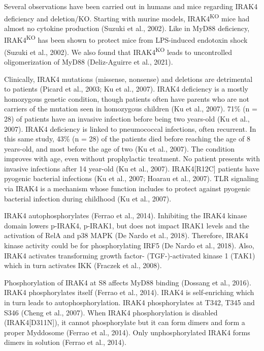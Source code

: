 Several observations have been carried out in humans and mice regarding IRAK4 deficiency and deletion/KO. Starting with murine models, IRAK4\textsuperscript{KO} mice had almost no cytokine production (Suzuki et al., 2002). Like in MyD88 deficiency, IRAK4\textsuperscript{KO} has been shown to protect mice from LPS-induced endotoxin shock (Suzuki et al., 2002). We also found that IRAK4\textsuperscript{KO} leads to uncontrolled oligomerization of MyD88 (Deliz-Aguirre et al., 2021).

Clinically, IRAK4 mutations (missense, nonsense) and deletions are detrimental to patients (Picard et al., 2003; Ku et al., 2007). IRAK4 deficiency is a mostly homozygous genetic condition, though patients often have parents who are not carriers of the mutation seen in homozygous children (Ku et al., 2007). 71\% (n = 28) of patients have an invasive infection before being two years-old (Ku et al., 2007). IRAK4 deficiency is linked to pneumococcal infections, often recurrent. In this same study, 43\% (n = 28) of the patients died before reaching the age of 8 years-old, and most before the age of two (Ku et al., 2007). The condition improves with age, even without prophylactic treatment. No patient presents with invasive infections after 14 year-old (Ku et al., 2007). IRAK4[R12C] patients have pyogenic bacterial infections (Ku et al., 2007; Hoarau et al., 2007). TLR signaling via IRAK4 is a mechanism whose function includes to protect against pyogenic bacterial infection during childhood (Ku et al., 2007).

IRAK4 autophosphorylates (Ferrao et al., 2014). Inhibiting the IRAK4 kinase domain lowers p-IRAK4, p-IRAK1, but does not impact IRAK1 levels and the activation of RelA and p38 MAPK (De Nardo et al., 2018). Therefore, IRAK4 kinase activity could be for phosphorylating IRF5 (De Nardo et al., 2018). Also, IRAK4 activates transforming growth factor-{\textbeta} (TGF-{\textbeta})-activated kinase 1 (TAK1) which in turn activates IKK{\textbeta} (Fraczek et al., 2008).

 Phosphorylation of IRAK4 at S8 affects MyD88 binding (Dossang et al., 2016). IRAK4 phosphorylates itself (Ferrao et al., 2014). IRAK4 is self-enriching which in turn leads to autophosphorylation. IRAK4 phosphorylates at T342, T345 and S346 (Cheng et al., 2007). When IRAK4 phosphorylation is disabled (IRAK4[D311N]), it cannot phosphorylate but it can form dimers and form a proper Myddosome (Ferrao et al., 2014). Only unphosphorylated IRAK4 forms dimers in solution (Ferrao et al., 2014).

